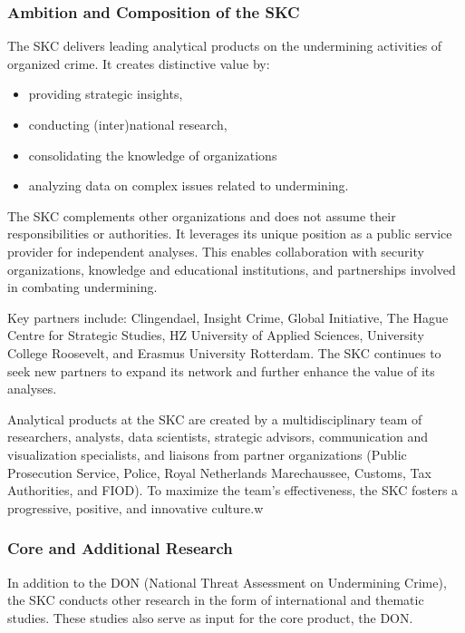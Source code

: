 \subsubsection{Ambition and Composition of the SKC}
\label{subsubsec:Ambition-and-composition}
The SKC delivers leading analytical products on the undermining activities of organized crime. It creates distinctive value by:
\begin{itemize}
	\item providing strategic insights,
	\item conducting (inter)national research,
	\item consolidating the knowledge of organizations
	\item analyzing data on complex issues related to undermining.
\end{itemize}

The SKC complements other organizations and does not assume their responsibilities or authorities. It leverages its unique position as a public service provider for independent analyses. This enables collaboration with security organizations, knowledge and educational institutions, and partnerships involved in combating undermining. 

Key partners include: Clingendael, Insight Crime, Global Initiative, The Hague Centre for Strategic Studies, HZ University of Applied Sciences, University College Roosevelt, and Erasmus University Rotterdam. The SKC continues to seek new partners to expand its network and further enhance the value of its analyses.

Analytical products at the SKC are created by a multidisciplinary team of researchers, analysts, data scientists, strategic advisors, communication and visualization specialists, and liaisons from partner organizations (Public Prosecution Service, Police, Royal Netherlands Marechaussee, Customs, Tax Authorities, and FIOD). To maximize the team’s effectiveness, the SKC fosters a progressive, positive, and innovative culture.w

\subsubsection{Core and Additional Research}
\label{subsubsec:Core-and-additional-research}
In addition to the DON (National Threat Assessment on Undermining Crime), the SKC conducts other research in the form of international and thematic studies. These studies also serve as input for the core product, the DON.

